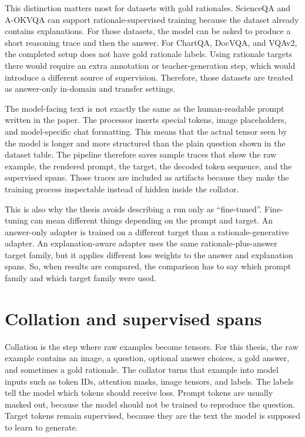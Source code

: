 \documentclass[12pt,bibliography=totoc,listof=totoc,BCOR=5mm,DIV=12,oneside,open=any]{scrbook}
\begin{document}
This distinction matters most for datasets with gold rationales.
ScienceQA and A-OKVQA can support rationale-supervised training because the dataset already contains explanations.
For those datasets, the model can be asked to produce a short reasoning trace and then the answer.
For ChartQA, DocVQA, and VQAv2, the completed setup does not have gold rationale labels.
Using rationale targets there would require an extra annotation or teacher-generation step, which would introduce a different source of supervision.
Therefore, those datasets are treated as answer-only in-domain and transfer settings.

The model-facing text is not exactly the same as the human-readable prompt written in the paper.
The processor inserts special tokens, image placeholders, and model-specific chat formatting.
This means that the actual tensor seen by the model is longer and more structured than the plain question shown in the dataset table.
The pipeline therefore saves sample traces that show the raw example, the rendered prompt, the target, the decoded token sequence, and the supervised spans.
Those traces are included as artifacts because they make the training process inspectable instead of hidden inside the collator.

This is also why the thesis avoids describing a run only as ``fine-tuned''.
Fine-tuning can mean different things depending on the prompt and target.
An answer-only adapter is trained on a different target than a rationale-generative adapter.
An explanation-aware adapter uses the same rationale-plus-answer target family, but it applies different loss weights to the answer and explanation spans.
So, when results are compared, the comparison has to say which prompt family and which target family were used.

\section{Collation and supervised spans}
Collation is the step where raw examples become tensors.
For this thesis, the raw example contains an image, a question, optional answer choices, a gold answer, and sometimes a gold rationale.
The collator turns that example into model inputs such as token IDs, attention masks, image tensors, and labels.
The labels tell the model which tokens should receive loss.
Prompt tokens are usually masked out, because the model should not be trained to reproduce the question.
Target tokens remain supervised, because they are the text the model is supposed to learn to generate.
\end{document}
